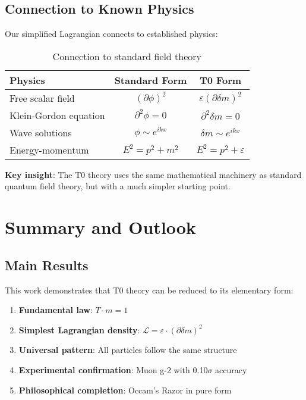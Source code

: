 \documentclass[12pt,a4paper]{article}
\newcommand{\deltam}{\delta m}
\newcommand{\Lag}{\mathcal{L}}
\theoremstyle{definition}
\theoremstyle{remark}
\begin{document}
	\subsection{Connection to Known Physics}
	
	Our simplified Lagrangian connects to established physics:
	
	\begin{table}[htbp]
		\centering
		\begin{tabular}{lcc}
			\toprule
			\textbf{Physics} & \textbf{Standard Form} & \textbf{T0 Form} \\
			\midrule
			Free scalar field & $(\partial \phi)^2$ & $\varepsilon(\partial \deltam)^2$ \\
			Klein-Gordon equation & $\partial^2 \phi = 0$ & $\partial^2 \deltam = 0$ \\
			Wave solutions & $\phi \sim e^{ikx}$ & $\deltam \sim e^{ikx}$ \\
			Energy-momentum & $E^2 = p^2 + m^2$ & $E^2 = p^2 + \varepsilon$ \\
			\bottomrule
		\end{tabular}
		\caption{Connection to standard field theory}
		\label{tab:standard_connection}
	\end{table}
	
	\textbf{Key insight}: The T0 theory uses the same mathematical machinery as standard quantum field theory, but with a much simpler starting point.
	
	\section{Summary and Outlook}
	
	\subsection{Main Results}
	
	This work demonstrates that T0 theory can be reduced to its elementary form:
	
	\begin{enumerate}
		\item \textbf{Fundamental law}: $T \cdot m = 1$
		\item \textbf{Simplest Lagrangian density}: $\Lag = \varepsilon \cdot (\partial \deltam)^2$
		\item \textbf{Universal pattern}: All particles follow the same structure
		\item \textbf{Experimental confirmation}: Muon g-2 with 0.10$\sigma$ accuracy
		\item \textbf{Philosophical completion}: Occam's Razor in pure form
	\end{enumerate}
	
\end{document}
